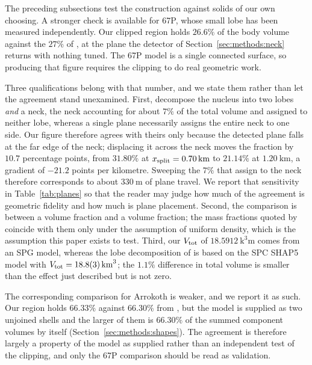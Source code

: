 The preceding subsections test the construction against solids of our own
choosing. A stronger check is available for 67P, whose small lobe has
been measured independently. Our clipped region holds $26.6\%$ of the
body volume against the $27\%$ of \citet{jorda2016}, at the plane the
detector of Section~\ref{sec:methods:neck} returns with nothing tuned.
The 67P model is a single connected surface, so producing that figure
requires the clipping to do real geometric work.

Three qualifications belong with that number, and we state them rather
than let the agreement stand unexamined. First, \citet{jorda2016}
decompose the nucleus into two lobes \emph{and} a neck, the neck
accounting for about $7\%$ of the total volume and assigned to neither
lobe, whereas a single plane necessarily assigns the entire neck to one
side. Our figure therefore agrees with theirs only because the detected
plane falls at the far edge of the neck; displacing it across the neck
moves the fraction by $10.7$ percentage points, from $31.80\%$ at
$x_{\mathrm{split}} = \SI{0.70}{\kilo\metre}$ to $21.14\%$ at $\SI{1.20}{\kilo\metre}$,
a gradient of $-21.2$ points per kilometre. Sweeping the $7\%$ that
\citet{jorda2016} assign to the neck therefore corresponds to about
$\SI{330}{\metre}$ of plane travel. We report that sensitivity in
Table~\ref{tab:planes} so that the reader may judge how much of the
agreement is geometric fidelity and how much is plane placement.
Second, the comparison is between a volume fraction and a volume
fraction; the mass fractions quoted by \citet{jorda2016} coincide with
them only under the assumption of uniform density, which is the
assumption this paper exists to test. Third, our $V_{\mathrm{tot}}$ of
$\SI{18.5912}{\cubic\kilo\metre}$ comes from an SPG model, whereas the
lobe decomposition of \citet{jorda2016} is based on the SPC SHAP5 model
with $V_{\mathrm{tot}} = \SI{18.8+-0.3}{\cubic\kilo\metre}$; the $1.1\%$ difference
in total volume is smaller than the effect just described but is not
zero.

The corresponding comparison for Arrokoth is weaker, and we report it as
such. Our region holds $66.33\%$ against $66.30\%$ from
\citet{porter2024}, but the model is supplied as two unjoined shells and
the larger of them is $66.30\%$ of the summed component volumes by itself
(Section~\ref{sec:methods:shapes}). The agreement is therefore largely a
property of the model as supplied rather than an independent test of the
clipping, and only the 67P comparison should be read as validation.

